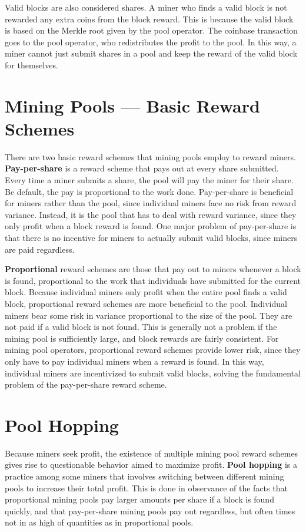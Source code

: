 \documentclass[full.tex]{subfiles}
\begin{document}
    Valid blocks are also considered shares. A miner who finds a valid block is not rewarded any extra coins from the block reward. This is because the valid block is based on the Merkle root given by the pool operator. The coinbase transaction goes to the pool operator, who redistributes the profit to the pool. In this way, a miner cannot just submit shares in a pool and keep the reward of the valid block for themselves.
    
    \section*{Mining Pools --- Basic Reward Schemes}
    
    There are two basic reward schemes that mining pools employ to reward miners. \textbf{Pay-per-share} is a reward scheme that pays out at every share submitted. Every time a miner submits a share, the pool will pay the miner for their share. Be default, the pay is proportional to the work done. Pay-per-share is beneficial for miners rather than the pool, since individual miners face no risk from reward variance. Instead, it is the pool that has to deal with reward variance, since they only profit when a block reward is found. One major problem of pay-per-share is that there is no incentive for miners to actually submit valid blocks, since miners are paid regardless.
    
    \textbf{Proportional} reward schemes are those that pay out to miners whenever a block is found, proportional to the work that individuals have submitted for the current block. Because individual miners only profit when the entire pool finds a valid block, proportional reward schemes are more beneficial to the pool. Individual miners bear some risk in variance proportional to the size of the pool. They are not paid if a valid block is not found. This is generally not a problem if the mining pool is sufficiently large, and block rewards are fairly consistent. For mining pool operators, proportional reward schemes provide lower risk, since they only have to pay individual miners when a reward is found. In this way, individual miners are incentivized to submit valid blocks, solving the fundamental problem of the pay-per-share reward scheme.
    
    \section*{Pool Hopping}
    
    Because miners seek profit, the existence of multiple mining pool reward schemes gives rise to questionable behavior aimed to maximize profit. \textbf{Pool hopping} is a practice among some miners that involves switching between different mining pools to increase their total profit. This is done in observance of the facts that proportional mining pools pay larger amounts per share if a block is found quickly, and that pay-per-share mining pools pay out regardless, but often times not in as high of quantities as in proportional pools.
    
\end{document}
